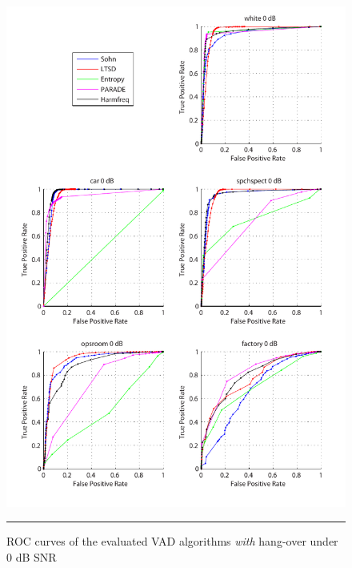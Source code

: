 \begin{figure}[htbp]
	\centering
		\includegraphics[width=1.0\columnwidth]{Figures/Chapter3/0dBh.pdf}
		\rule{37em}{0.5pt}
	\caption[ROC curves of the evaluated algorithms \emph{with} hang-over under 0 dB SNR]{ROC curves of the evaluated VAD algorithms \emph{with} hang-over under 0 dB SNR}
	\label{fig:0dBh}
\end{figure}

